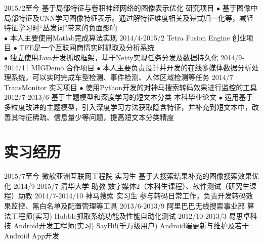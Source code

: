 \documentclass[a4paper,10pt]{professional-cv-cn}
\begin{document}
\begin{entrylist}
  \entry
    {2015/2至今}
    {基于局部特征与卷积神经网络的图像表示优化}
    {研究项目}
    {$\bullet$ 基于图像中局部特征及CNN学习图像特征表示。通过解特征维度相关及幂式归一化等，减轻特征学习时“丛发词”带来的负面影响 \\
    $\bullet$ 本人主要使用Matlab完成算法实现}
  \entry
    {2014/4-2015/2}
    {Tetra Fusion Engine}
    {创业项目}
    {$\bullet$ TFE是一个互联网商情实时抓取及分析系统\\
    $\bullet$ 独立使用Java开发抓取框架，基于Netty实现任务分发及数据持久化}
  \entry
    {2014/9-2014/11}
    {MIGDemo}
    {合作项目}
    {$\bullet$ 本人主要负责设计并开发的在线多媒体数据分析处理系统，可以实时完成车型检测、事件检测、人体区域检测等任务}
  \entry
    {2014/7}
    {TransMonitor}
    {实习项目}
    {$\bullet$ 使用Python开发的对神马搜索转码效果进行监控的工具}
  \entry
    {2012/7-2013/6}
    {基于主题模型和深度学习的短文本分类}
    {本科毕业论文}
    {$\bullet$ 运用基于多粒度改进的主题模型，引入深度学习方法获取隐含特征，并补充到短文本中，改善其特征稀疏、信息量少等问题，提高短文本分类精度}
\end{entrylist}

\section{实习经历}
\begin{entrylist}
  \internentry
    {2015/7至今}
    {微软亚洲互联网工程院}
    {实习生}
    {基于大搜索结果补充的图像搜索效果优化}
  \internentry
    {2014/9-2015/7}
    {清华大学}
    {助教}
    {数字媒体2（本科生课程）、软件测试（研究生课程）助教}
  \internentry
    {2014/7-2014/10}
    {神马搜索}
    {实习生}
    {参与转码日常工作，负责开发转码效果监控、黑白名单及配置管理等工具}
  \internentry
    {2013/6-2013/9}
    {阿里巴巴无线搜索事业部}
    {算法工程师(实习)}
    {Hubble抓取系统功能及性能自动化测试}
  \internentry
    {2012/10-2013/3}
    {易思卓科技}
    {Android开发工程师(实习)}
    {SayHi!(千万级用户) Android端更新与维护及若干Android App开发}
\end{entrylist}
\end{document}
